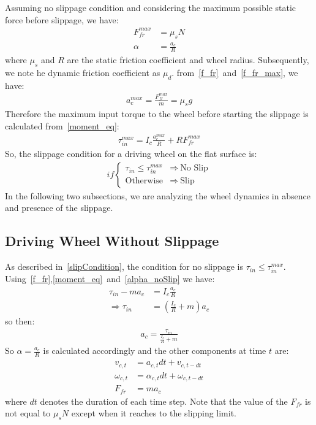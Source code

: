 \documentclass[letterpaper, 10pt, conference]{ieeeconf}
\begin{document}
Assuming no slippage condition and considering the maximum possible static force before slippage, we have:
\begin{align}
F_{fr}^{max} &= \mu_{s} N \label{f_fr_max} \\
\alpha &= \frac{a_c}{R} \label{alpha_noSlip}
\end{align}
where $\mu_s$ and $R$ are the static friction coefficient and wheel radius. Subsequently, we note he dynamic friction coefficient as $\mu_d$. from~\eqref{f_fr}~and~\eqref{f_fr_max}, we have:
\begin{align}
a_c^{max} = \frac{F_{fr}^{max}}{m} = \mu_s g
\end{align}
Therefore the maximum input torque to the wheel before starting the slippage is calculated from~\eqref{moment_eq}:
\begin{align}
\tau_{in}^{max} = I_c \frac{a_c^{max}}{R} + R F_{fr}^{max}
\end{align}
So, the slippage condition for a driving wheel on the flat surface is:
\begin{align}
if \begin{cases}
\tau_{in} \leqslant \tau_{in}^{max} &\Rightarrow \ \text{No Slip} \\
\text{Otherwise} &\Rightarrow \ \text{Slip}
\end{cases} \label{slipCondition}
\end{align}
In the following two subsections, we are analyzing the wheel dynamics in absence and presence of the slippage.
\subsection{Driving Wheel Without Slippage}
As described in~\eqref{slipCondition}, the condition for no slippage is $\tau_{in} \leqslant \tau_{in}^{max}$. Using~\eqref{f_fr},\eqref{moment_eq}~and~\eqref{alpha_noSlip} we have:
\begin{align*}
\tau_{in} - ma_c &= I_c \frac{a_c}{R} \\
\Rightarrow \tau_{in} &= (\frac{I_c}{R} + m)a_c
\end{align*}
so then:
\begin{align}
a_c = \frac{\tau_{in}}{\frac{I_c}{R} + m}
\end{align}
So $\alpha = \frac{a_c}{R}$ is calculated accordingly and the other components at time $t$ are:
\begin{align}
v_{c,t} &= a_{c,t}dt + v_{c,t-dt} \label{linearVel}\\
\omega_{c,t} &= \alpha_{c,t}dt + \omega_{c,t-dt} \label{angularVel}\\
F_{fr} &= ma_c
\end{align}
where $dt$ denotes the duration of each time step. Note that the value of the $F_{fr}$ is not equal to $\mu_sN$ except when it reaches to the slipping limit.
\end{document}
